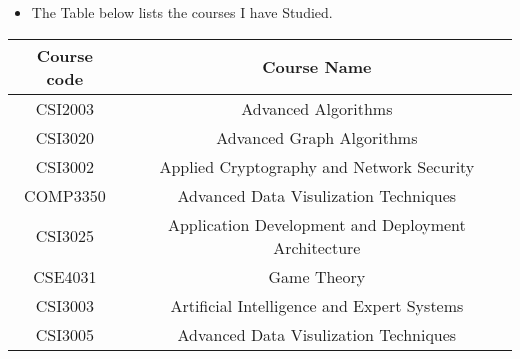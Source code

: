 \documentclass{myresume}
\begin{document}
            \begin{itemize}
                \item The Table below lists the courses I have Studied.
                
            \end{itemize}
        \begin{center}
        \begin{tabular}{| c | c |}
                \hline
                \textbf{Course code} & \textbf{Course Name} \\
                \hline
                CSI2003 & Advanced Algorithms \\
                \hline
                CSI3020 & Advanced Graph Algorithms \\
                \hline
                CSI3002 & Applied Cryptography and Network Security \\
                \hline
                COMP3350 & Advanced Data Visulization Techniques \\
                \hline
                CSI3025 & Application Development and Deployment Architecture  \\
                \hline
                CSE4031 & Game Theory  \\
                \hline
                CSI3003 & Artificial Intelligence and Expert Systems \\
                \hline
                CSI3005 & Advanced Data Visulization Techniques \\
                \hline
            \end{tabular}
            \end{center}
         
        
\end{document}
